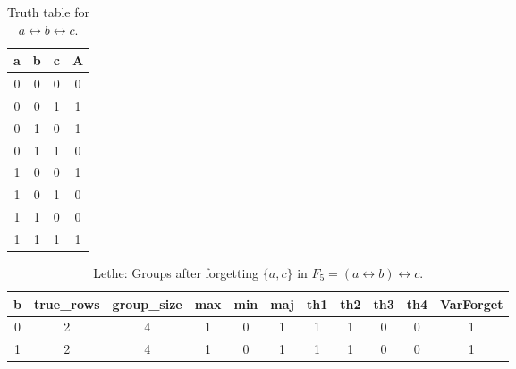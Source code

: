 \begin{table}[!tb]
    \centering
    \begin{tabular}{|c|c|c|c|}
        \hline
        \textbf{a} & \textbf{b} & \textbf{c} & \textbf{A} \\ \hline
        0 & 0 & 0 & 0 \\ \hline
        0 & 0 & 1 & 1 \\ \hline
        0 & 1 & 0 & 1 \\ \hline
        0 & 1 & 1 & 0 \\ \hline
        1 & 0 & 0 & 1 \\ \hline
        1 & 0 & 1 & 0 \\ \hline
        1 & 1 & 0 & 0 \\ \hline
        1 & 1 & 1 & 1 \\ \hline
    \end{tabular}
    \caption{Truth table for $a \leftrightarrow b \leftrightarrow c$.}
    \label{tab:truthtab}
\end{table}

\begin{table}[!tb]
    \centering
    \begin{tabular}{|c|c|c|c|c|c|c|c|c|c|c|}
        \hline
        \textbf{b} & \textbf{true\_rows} & \textbf{group\_size} & \textbf{max} & \textbf{min} & \textbf{maj} & \textbf{th1} & \textbf{th2} & \textbf{th3} & \textbf{th4} & \textbf{VarForget} \\ \hline
        \rowcolor{gray!40} 0 & 2 & 4 & 1 & 0 & 1 & 1 & 1 & 0 & 0 & 1 \\ \hline
        \rowcolor{blue!40} 1 & 2 & 4 & 1 & 0 & 1 & 1 & 1 & 0 & 0 & 1 \\ \hline
    \end{tabular}
    \caption{Lethe: Groups after forgetting $\{a, c\}$ in $F_{5} = (a \leftrightarrow b) \leftrightarrow c$.}
    \label{tab:lethe-F5-ac-groups}
\end{table}
